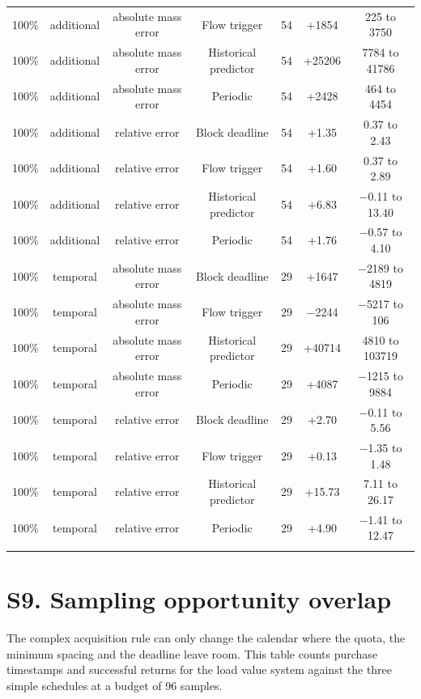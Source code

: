 \documentclass[lineno,pdflatex,sn-apa]{sn-jnl}%
\theoremstyle{thmstyleone}%
\theoremstyle{thmstyletwo}%
\theoremstyle{thmstylethree}%
\begin{document}
\begin{center}
\begin{tabular}{@{}lcccccc@{}}
100\% & additional & absolute mass error & Flow trigger & 54 & +1854 & 225 to 3750\\
100\% & additional & absolute mass error & Historical predictor & 54 & +25206 & 7784 to 41786\\
100\% & additional & absolute mass error & Periodic & 54 & +2428 & 464 to 4454\\
100\% & additional & relative error & Block deadline & 54 & +1.35 & 0.37 to 2.43\\
100\% & additional & relative error & Flow trigger & 54 & +1.60 & 0.37 to 2.89\\
100\% & additional & relative error & Historical predictor & 54 & +6.83 & $-$0.11 to 13.40\\
100\% & additional & relative error & Periodic & 54 & +1.76 & $-$0.57 to 4.10\\
100\% & temporal & absolute mass error & Block deadline & 29 & +1647 & $-$2189 to 4819\\
100\% & temporal & absolute mass error & Flow trigger & 29 & $-$2244 & $-$5217 to 106\\
100\% & temporal & absolute mass error & Historical predictor & 29 & +40714 & 4810 to 103719\\
100\% & temporal & absolute mass error & Periodic & 29 & +4087 & $-$1215 to 9884\\
100\% & temporal & relative error & Block deadline & 29 & +2.70 & $-$0.11 to 5.56\\
100\% & temporal & relative error & Flow trigger & 29 & +0.13 & $-$1.35 to 1.48\\
100\% & temporal & relative error & Historical predictor & 29 & +15.73 & 7.11 to 26.17\\
100\% & temporal & relative error & Periodic & 29 & +4.90 & $-$1.41 to 12.47\\
\botrule
\end{tabular}
\end{center}

\section*{S9. Sampling opportunity overlap}

The complex acquisition rule can only change the calendar where the quota, the minimum spacing and the deadline leave room. This table counts purchase timestamps and successful returns for the load value system against the three simple schedules at a budget of 96 samples.
\end{document}
